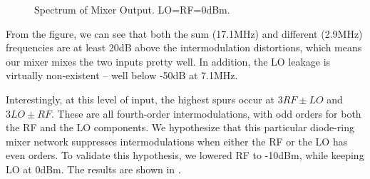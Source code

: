 \documentclass{article}
\begin{document}
\begin{figure}[h]
    \centering
    \caption{Spectrum of Mixer Output. LO=RF=0dBm.}
    \label{fig:mixer_out}
\end{figure}

From the figure, we can see that both the sum (17.1MHz) and different (2.9MHz) frequencies are at least 20dB above the intermodulation distortions, which means our mixer mixes the two inputs pretty well.
In addition, the LO leakage is virtually non-existent -- well below -50dB at 7.1MHz.

Interestingly, at this level of input, the highest spurs occur at $3RF\pm LO$ and $3LO \pm RF$.
These are all fourth-order intermodulations, with odd orders for both the RF and the LO components.
We hypothesize that this particular diode-ring mixer network suppresses intermodulations when either the RF or the LO has even orders.
To validate this hypothesis, we lowered RF to -10dBm, while keeping LO at 0dBm.
The results are shown in .
\end{document}
